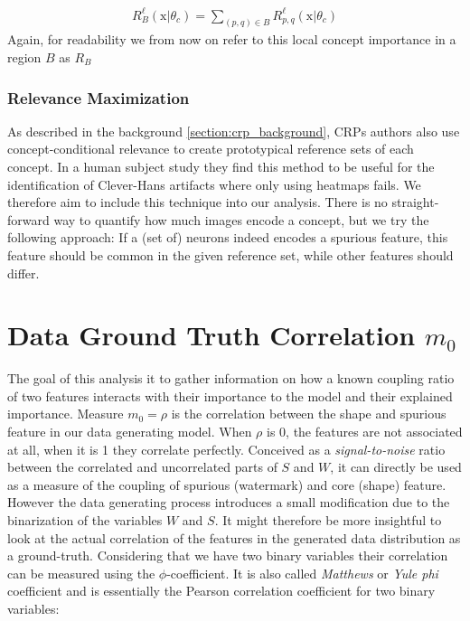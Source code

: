 \begin{align}\label{eq:local_importance}
    R_{B}^{\ell}(\mathrm{x} | \theta_c) = \sum_{(p,q) \in B} R_{p,q}^{\ell}(\mathrm{x} | \theta_c)
\end{align}
Again, for readability we from now on refer to this local concept importance in a region $B$ as $R_B$

\subsubsection{Relevance Maximization}
As described in the background \cref{section:crp_background}, CRPs authors also use concept-conditional relevance to create prototypical reference sets of each concept. In a human subject study \cite{Achtibat2023} they find this method to be useful for the identification of Clever-Hans artifacts where only using heatmaps fails. We therefore aim to include this technique into our analysis. There is no straight-forward way to quantify how much images encode a concept, but we try the following approach: If a (set of) neurons indeed encodes a spurious feature, this feature should be common in the given reference set, while other features should differ. 

\section{Data Ground Truth Correlation $m_0$}
The goal of this analysis it to gather information on how a known coupling ratio of two features interacts with their importance to the model and their explained importance. 
Measure $m_0 = \rho$ is the correlation between the shape and spurious feature in our data generating model. When $\rho$ is 0, the features are not associated at all, when it is 1 they correlate perfectly. Conceived as a \textit{signal-to-noise} ratio between the correlated and uncorrelated parts of $S$ and $W$, it can directly be used as a measure of the coupling of spurious (watermark) and core (shape) feature. However the data generating process introduces a small modification due to the binarization of the variables $W$ and $S$. It might therefore be more insightful to look at the actual correlation of the features in the generated data distribution as a ground-truth. Considering that we have two binary variables their correlation can be measured using the $\phi$-coefficient. It is also called \textit{Matthews} or \textit{Yule phi} coefficient and is essentially the Pearson correlation coefficient for two binary variables:


